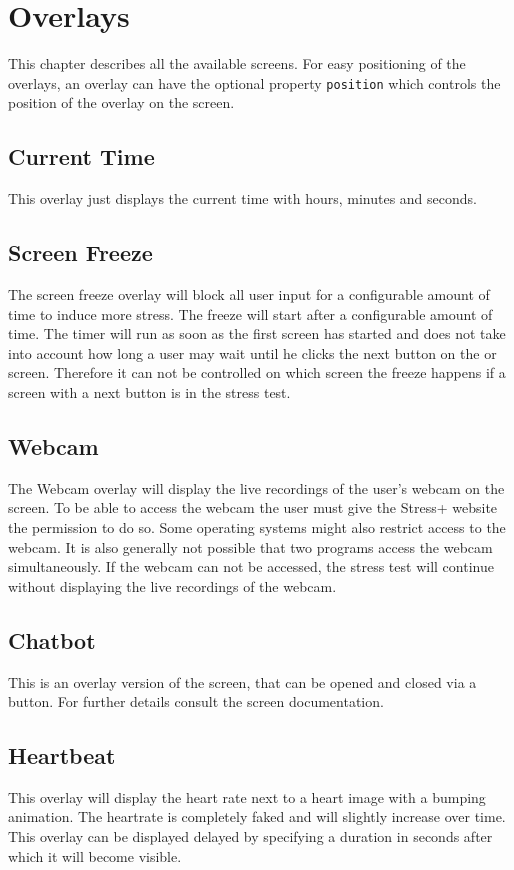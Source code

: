 \section{Overlays}
\label{sec:overlays}

This chapter describes all the available screens.
For easy positioning of the overlays, an overlay can have the optional property \texttt{position} which controls the position of the overlay on the screen.

\subsection{Current Time}
\label{sec:overlays-current-time}
This overlay just displays the current time with hours, minutes and seconds.

\subsection{Screen Freeze}
\label{sec:overlays-screen-freeze}
The screen freeze overlay will block all user input for a configurable amount of time to induce more stress.
The freeze will start after a configurable amount of time.
The timer will run as soon as the first screen has started and does not take into account how long a user may wait until he clicks the next button on the  or  screen.
Therefore it can not be controlled on which screen the freeze happens if a screen with a next button is in the stress test.

\subsection{Webcam}
\label{sec:overlays-webcam}
The Webcam overlay will display the live recordings of the user's webcam on the screen.
To be able to access the webcam the user must give the Stress+ website the permission to do so.
Some operating systems might also restrict access to the webcam.
It is also generally not possible that two programs access the webcam simultaneously.
If the webcam can not be accessed, the stress test will continue without displaying the live recordings of the webcam.

\subsection{Chatbot}
\label{sec:overlays-chatbot}
This is an overlay version of the  screen, that can be opened and closed via a button.
For further details consult the  screen documentation.


\subsection{Heartbeat}
\label{sec:overlays-heartbeat}
This overlay will display the heart rate next to a heart image with a bumping animation.
The heartrate is completely faked and will slightly increase over time.
This overlay can be displayed delayed by specifying a duration in seconds after which it will become visible.
